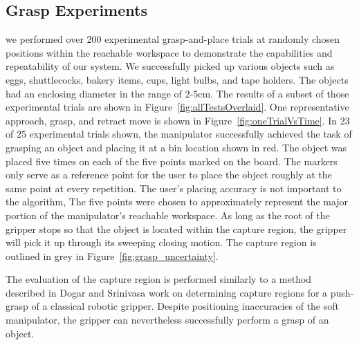 \subsection{Grasp Experiments}
we performed over 200 experimental grasp-and-place trials at randomly chosen positions within the reachable workspace to demonstrate the capabilities and repeatability of our system.
We successfully picked up various objects such as eggs, shuttlecocks, bakery items, cups, light bulbs, and tape holders. 
The objects had an enclosing diameter in the range of 2-5\unit{cm}. 
The results of a subset of those experimental trials are shown in Figure~\ref{fig:allTestsOverlaid}.
One representative approach, grasp, and retract move is shown in Figure~\ref{fig:oneTrialVsTime}.
In 23 of 25 experimental trials shown, the manipulator successfully achieved the task of grasping an object and placing it at a bin location shown in red.
The object was placed five times on each of the five points marked on the board.
The markers only serve as a reference point for the user to place the object roughly at the same point at every repetition.
The user's placing accuracy is not important to the algorithm, 
The five points were chosen to approximately represent the major portion of the manipulator's reachable workspace.
As long as the root of the gripper stops so that the object is located within the capture region, the gripper will pick it up through its sweeping closing motion. The capture region is outlined in grey in Figure~\ref{fig:grasp_uncertainty}. 

The evaluation of the capture region is performed similarly to a method described in Dogar and Srinivasa\cite{dogar2010push} work on determining capture regions for a push-grasp of a classical robotic gripper.
Despite positioning inaccuracies of the soft manipulator, the gripper can nevertheless successfully perform a grasp of an object. 

